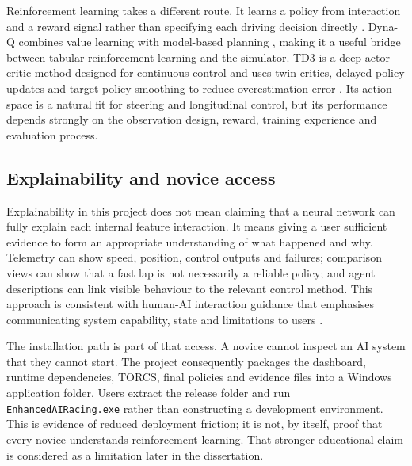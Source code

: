 Reinforcement learning takes a different route. It learns a policy from interaction and a reward signal rather than specifying each driving decision directly \parencite{suttonbarto2018}. Dyna-Q combines value learning with model-based planning \parencite{sutton1990}, making it a useful bridge between tabular reinforcement learning and the simulator. TD3 is a deep actor-critic method designed for continuous control and uses twin critics, delayed policy updates and target-policy smoothing to reduce overestimation error \parencite{fujimoto2018}. Its action space is a natural fit for steering and longitudinal control, but its performance depends strongly on the observation design, reward, training experience and evaluation process.

\subsection{Explainability and novice access}

Explainability in this project does not mean claiming that a neural network can fully explain each internal feature interaction. It means giving a user sufficient evidence to form an appropriate understanding of what happened and why. Telemetry can show speed, position, control outputs and failures; comparison views can show that a fast lap is not necessarily a reliable policy; and agent descriptions can link visible behaviour to the relevant control method. This approach is consistent with human-AI interaction guidance that emphasises communicating system capability, state and limitations to users \parencite{amershi2019}.

The installation path is part of that access. A novice cannot inspect an AI system that they cannot start. The project consequently packages the dashboard, runtime dependencies, TORCS, final policies and evidence files into a Windows application folder. Users extract the release folder and run \texttt{EnhancedAIRacing.exe} rather than constructing a development environment. This is evidence of reduced deployment friction; it is not, by itself, proof that every novice understands reinforcement learning. That stronger educational claim is considered as a limitation later in the dissertation.

